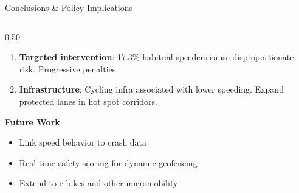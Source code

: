 \documentclass[aspectratio=169, 9pt]{beamer}
\begin{document}
\begin{frame}{Conclusions \& Policy Implications}
\begin{columns}[T]
\begin{column}{0.50\textwidth}
\begin{enumerate}
    \item \textbf{Targeted intervention}: 17.3\% habitual speeders cause disproportionate risk. Progressive penalties.

    \item \textbf{Infrastructure}: Cycling infra associated with lower speeding. Expand protected lanes in hot spot corridors.
  \end{enumerate}

  \vspace{4pt}
  \textbf{\textcolor{boxbrown}{Future Work}}
  \begin{itemize}\setlength\itemsep{0pt}\footnotesize
    \item Link speed behavior to crash data
    \item Real-time safety scoring for dynamic geofencing
    \item Extend to e-bikes and other micromobility
  \end{itemize}
\end{column}
\end{columns}
\end{frame}
\end{document}
